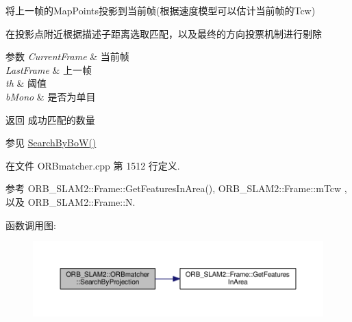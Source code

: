 \begin{DoxyEnumerate}
\item 将上一帧的\-Map\-Points投影到当前帧(根据速度模型可以估计当前帧的\-Tcw)
\item 在投影点附近根据描述子距离选取匹配，以及最终的方向投票机制进行剔除 
\begin{DoxyParams}{参数}
{\em Current\-Frame} & 当前帧 \\
\hline
{\em Last\-Frame} & 上一帧 \\
\hline
{\em th} & 阈值 \\
\hline
{\em b\-Mono} & 是否为单目 \\
\hline
\end{DoxyParams}
\begin{DoxyReturn}{返回}
成功匹配的数量 
\end{DoxyReturn}
\begin{DoxySeeAlso}{参见}
\hyperlink{classORB__SLAM2_1_1ORBmatcher_ab38a8d3f3803e398c173ef45b25e66d8}{Search\-By\-Bo\-W()} 
\end{DoxySeeAlso}

\end{DoxyEnumerate}

在文件 O\-R\-Bmatcher.\-cpp 第 1512 行定义.



参考 O\-R\-B\-\_\-\-S\-L\-A\-M2\-::\-Frame\-::\-Get\-Features\-In\-Area(), O\-R\-B\-\_\-\-S\-L\-A\-M2\-::\-Frame\-::m\-Tcw , 以及 O\-R\-B\-\_\-\-S\-L\-A\-M2\-::\-Frame\-::\-N.



函数调用图\-:
\nopagebreak
\begin{figure}[H]
\begin{center}
\leavevmode
\includegraphics[width=350pt]{classORB__SLAM2_1_1ORBmatcher_a0dba0b2bed7d16ca56e27ff4df00f557_cgraph}
\end{center}
\end{figure}


